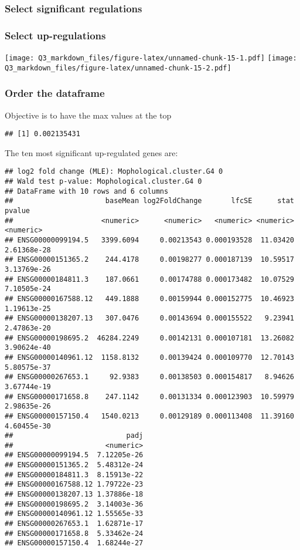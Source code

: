 \documentclass[
]{article}
\begin{document}
\hypertarget{select-significant-regulations}{%
\subsubsection{Select significant
regulations}\label{select-significant-regulations}}

\hypertarget{select-up-regulations}{%
\subsubsection{Select up-regulations}\label{select-up-regulations}}

\texttt{[image: Q3\_markdown\_files/figure-latex/unnamed-chunk-15-1.pdf]}
\texttt{[image: Q3\_markdown\_files/figure-latex/unnamed-chunk-15-2.pdf]}

\hypertarget{order-the-dataframe}{%
\subsubsection{Order the dataframe}\label{order-the-dataframe}}

Objective is to have the max values at the top

\begin{verbatim}
## [1] 0.002135431
\end{verbatim}

The ten most significant up-regulated genes are:

\begin{verbatim}
## log2 fold change (MLE): Mophological.cluster.G4 0 
## Wald test p-value: Mophological.cluster.G4 0 
## DataFrame with 10 rows and 6 columns
##                      baseMean log2FoldChange       lfcSE      stat      pvalue
##                     <numeric>      <numeric>   <numeric> <numeric>   <numeric>
## ENSG00000099194.5   3399.6094     0.00213543 0.000193528  11.03420 2.61368e-28
## ENSG00000151365.2    244.4178     0.00198277 0.000187139  10.59517 3.13769e-26
## ENSG00000184811.3    187.0661     0.00174788 0.000173482  10.07529 7.10505e-24
## ENSG00000167588.12   449.1888     0.00159944 0.000152775  10.46923 1.19613e-25
## ENSG00000138207.13   307.0476     0.00143694 0.000155522   9.23941 2.47863e-20
## ENSG00000198695.2  46284.2249     0.00142131 0.000107181  13.26082 3.90624e-40
## ENSG00000140961.12  1158.8132     0.00139424 0.000109770  12.70143 5.80575e-37
## ENSG00000267653.1     92.9383     0.00138503 0.000154817   8.94626 3.67744e-19
## ENSG00000171658.8    247.1142     0.00131334 0.000123903  10.59979 2.98635e-26
## ENSG00000157150.4   1540.0213     0.00129189 0.000113408  11.39160 4.60455e-30
##                           padj
##                      <numeric>
## ENSG00000099194.5  7.12205e-26
## ENSG00000151365.2  5.48312e-24
## ENSG00000184811.3  8.15913e-22
## ENSG00000167588.12 1.79722e-23
## ENSG00000138207.13 1.37886e-18
## ENSG00000198695.2  3.14003e-36
## ENSG00000140961.12 1.55565e-33
## ENSG00000267653.1  1.62871e-17
## ENSG00000171658.8  5.33462e-24
## ENSG00000157150.4  1.68244e-27
\end{verbatim}
\end{document}
